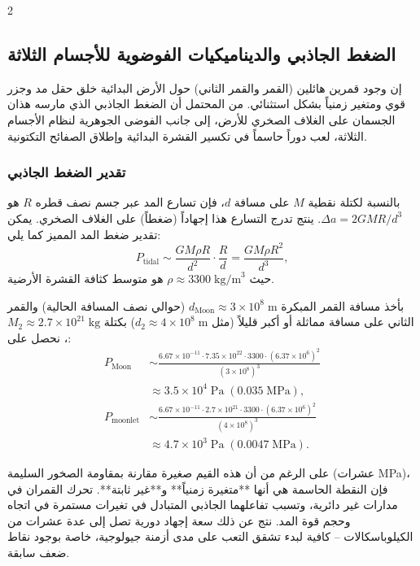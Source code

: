 \documentclass[11pt,a4paper]{article}
\begin{document}
\begin{multicols}{2}
		\subsection{الضغط الجاذبي والديناميكيات الفوضوية للأجسام الثلاثة}
		إن وجود قمرين هائلين (القمر والقمر الثاني) حول الأرض البدائية خلق حقل مد وجزر قوي ومتغير زمنياً بشكل استثنائي. من المحتمل أن الضغط الجاذبي الذي مارسه هذان الجسمان على الغلاف الصخري للأرض، إلى جانب الفوضى الجوهرية لنظام الأجسام الثلاثة، لعب دوراً حاسماً في تكسير القشرة البدائية وإطلاق الصفائح التكتونية.
		
		\subsubsection{تقدير الضغط الجاذبي}
		بالنسبة لكتلة نقطية \(M\) على مسافة \(d\)، فإن تسارع المد عبر جسم نصف قطره \(R\) هو \(\Delta a = 2GM R / d^{3}\). ينتج تدرج التسارع هذا إجهاداً (ضغطاً) على الغلاف الصخري. يمكن تقدير ضغط المد المميز كما يلي:
		\[
		P_{\text{tidal}} \sim \frac{GM \rho R}{d^{2}} \cdot \frac{R}{d} = \frac{GM \rho R^{2}}{d^{3}},
		\]
		حيث \(\rho \approx 3300\;\text{kg/m}^{3}\) هو متوسط كثافة القشرة الأرضية.
		
		بأخذ مسافة القمر المبكرة \(d_{\text{Moon}} \approx 3\times10^{8}\;\text{m}\) (حوالي نصف المسافة الحالية) والقمر الثاني على مسافة مماثلة أو أكبر قليلاً (مثل \(d_{2} \approx 4\times10^{8}\;\text{m}\)) بكتلة \(M_{2} \approx 2.7\times10^{21}\;\text{kg}\)، نحصل على:
		\[
		\begin{aligned}
			P_{\text{Moon}} &\sim \frac{6.67\times10^{-11} \cdot 7.35\times10^{22} \cdot 3300 \cdot (6.37\times10^{6})^{2}}{(3\times10^{8})^{3}} \\
			&\approx 3.5 \times 10^{4}\;\text{Pa} \;(0.035\;\text{MPa}),\\
			P_{\text{moonlet}} &\sim \frac{6.67\times10^{-11} \cdot 2.7\times10^{21} \cdot 3300 \cdot (6.37\times10^{6})^{2}}{(4\times10^{8})^{3}} \\
			&\approx 4.7 \times 10^{3}\;\text{Pa} \;(0.0047\;\text{MPa}).
		\end{aligned}
		\]
		
		على الرغم من أن هذه القيم صغيرة مقارنة بمقاومة الصخور السليمة (عشرات MPa)، فإن النقطة الحاسمة هي أنها **متغيرة زمنياً** و**غير ثابتة**. تحرك القمران في مدارات غير دائرية، وتسبب تفاعلهما الجاذبي المتبادل في تغيرات مستمرة في اتجاه وحجم قوة المد. نتج عن ذلك سعة إجهاد دورية تصل إلى عدة عشرات من الكيلوباسكالات – كافية لبدء تشقق التعب على مدى أزمنة جيولوجية، خاصة بوجود نقاط ضعف سابقة.
		

\end{multicols}
\end{document}
